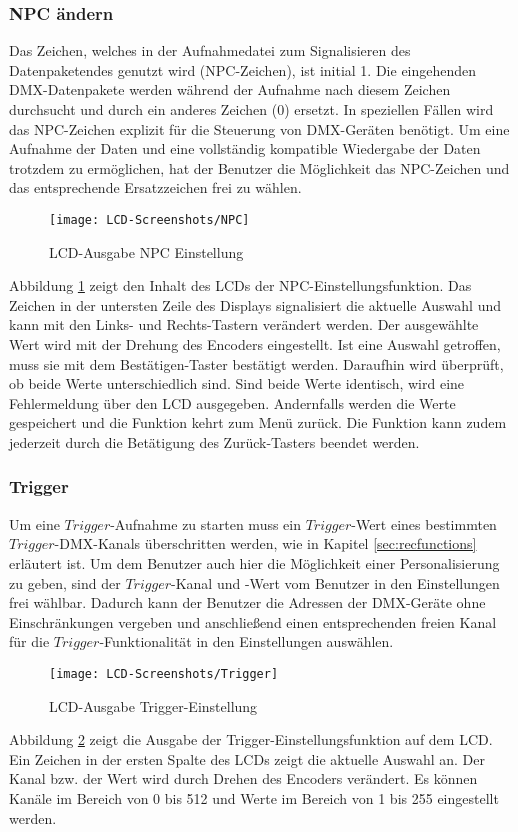 \subsubsection{NPC ändern}
Das Zeichen, welches in der Aufnahmedatei zum Signalisieren des Datenpaketendes genutzt wird (NPC-Zeichen), ist initial 1. Die eingehenden DMX-Datenpakete werden während der Aufnahme nach diesem Zeichen durchsucht und durch ein anderes Zeichen (0) ersetzt. In speziellen Fällen wird das NPC-Zeichen explizit für die Steuerung von DMX-Geräten benötigt. Um eine Aufnahme der Daten und eine vollständig kompatible Wiedergabe der Daten trotzdem zu ermöglichen, hat der Benutzer die Möglichkeit das NPC-Zeichen und das entsprechende Ersatzzeichen frei zu wählen. 
\begin{figure}[h]
	\begin{center}
		\texttt{[image: LCD-Screenshots/NPC]}
		\caption{LCD-Ausgabe NPC Einstellung}
		\label{fig:npc}
	\end{center}
\end{figure}
Abbildung \ref{fig:npc} zeigt den Inhalt des LCDs der NPC-Einstellungsfunktion. Das Zeichen in der untersten Zeile des Displays signalisiert die aktuelle Auswahl und kann mit den Links- und Rechts-Tastern verändert werden. Der ausgewählte Wert wird mit der Drehung des Encoders eingestellt. Ist eine Auswahl getroffen, muss sie mit dem Bestätigen-Taster bestätigt werden. Daraufhin wird überprüft, ob beide Werte unterschiedlich sind. Sind beide Werte identisch, wird eine Fehlermeldung über den LCD ausgegeben. Andernfalls werden die Werte gespeichert und die Funktion kehrt zum Menü zurück. Die Funktion kann zudem jederzeit durch die Betätigung des Zurück-Tasters beendet werden.
\subsubsection{Trigger}
Um eine $Trigger$-Aufnahme zu starten muss ein $Trigger$-Wert eines bestimmten $Trigger$-DMX-Kanals überschritten werden, wie in Kapitel \ref{sec:recfunctions} erläutert ist. Um dem Benutzer auch hier die Möglichkeit einer Personalisierung zu geben, sind der $Trigger$-Kanal und -Wert vom Benutzer in den Einstellungen frei wählbar. Dadurch kann der Benutzer die Adressen der DMX-Geräte ohne Einschränkungen vergeben und anschließend einen entsprechenden freien Kanal für die $Trigger$-Funktionalität in den Einstellungen auswählen. 
\begin{figure}[h]
	\begin{center}
		\texttt{[image: LCD-Screenshots/Trigger]}
		\caption{LCD-Ausgabe Trigger-Einstellung}
		\label{fig:trig}
	\end{center}
\end{figure}
Abbildung \ref{fig:trig} zeigt die Ausgabe der Trigger-Einstellungsfunktion auf dem LCD. Ein Zeichen in der ersten Spalte des LCDs zeigt die aktuelle Auswahl an. Der Kanal bzw. der Wert wird durch Drehen des Encoders verändert. Es können Kanäle im Bereich von 0 bis 512 und Werte im Bereich von 1 bis 255 eingestellt werden. 

